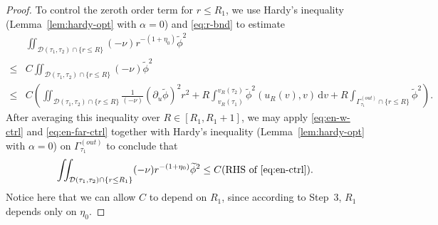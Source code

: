 \documentclass[10pt, reqno]{amsart}
\theoremstyle{definition}
\theoremstyle{remark}
\theoremstyle{conjecture}
\numberwithin{equation}{section}
\newcommand{\set}[1]{\{#1\}}
\newcommand{\ud}{\mathrm{d}}
\newcommand{\rd}{\partial}
\newcommand{\0}{\emptyset}
\newcommand{\alp}{\alpha}
\newcommand{\calD}{\mathcal D}
\newcommand{\dur}{\nu}
\newcommand{\phibg}{\overline{\phi}}				%
\newcommand{\phidf}{\widetilde{\phi}}				%
\begin{document}
\begin{proof}
To control the zeroth order term for $r\leq R_1$, we use Hardy's inequality (Lemma~\ref{lem:hardy-opt} with $\alp = 0$) and \eqref{eq:r-bnd} to estimate
\begin{align*}
	&\iint_{\calD(\tau_{1}, \tau_{2}) \cap \set{r \leq R}} (-\dur) r^{-(1+\eta_{0})} \phidf^{2} \\
	\leq & C\iint_{\calD(\tau_{1}, \tau_{2}) \cap \set{r \leq R}} (-\dur) \phidf^{2} \\
	\leq & C \left( \iint_{\calD(\tau_{1}, \tau_{2}) \cap \set{r \leq R}} \frac{1}{(-\dur)} (\rd_{u} \phidf)^{2} r^{2}
		+ R \int_{v_{R}(\tau_{1})}^{v_{R}(\tau_{2})} \phidf^{2}(u_{R}(v), v) \, \ud v  + R \int_{\Gamma_{\tau_{1}}^{(out)}\cap\{r \leq R\}} \phidf^{2} \right).
\end{align*}
After averaging this inequality over $R \in [R_{1}, R_{1}+1]$, we may apply \eqref{eq:en-w-ctrl} and \eqref{eq:en-far-ctrl} together with Hardy's inequality (Lemma~\ref{lem:hardy-opt} with $\alp = 0$) on $\Gamma_{\tau_{1}}^{(out)}$ to conclude that
\begin{equation*}
\iint_{\calD(\tau_{1}, \tau_{2}) \cap \set{r \leq R_{1}}} (-\dur) r^{-(1+\eta_{0})} \phidf^{2} 
\leq C (\hbox{RHS of \eqref{eq:en-ctrl}}).
\end{equation*}
Notice here that we can allow $C$ to depend on $R_{1}$, since according to Step~3, $R_{1}$ depends only on $\eta_{0}$.


\end{proof}
\end{document}
